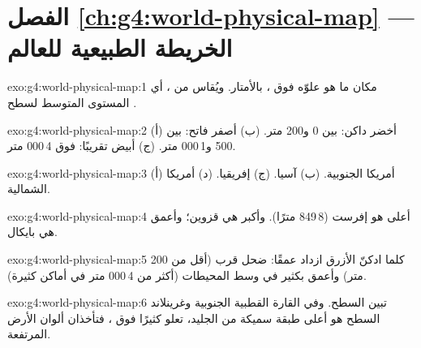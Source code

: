 \section*{الفصل \ref{ch:g4:world-physical-map} --- الخريطة الطبيعية للعالم}

\begin{solution}{exo:g4:world-physical-map:1}
 مكان ما هو علوّه فوق ، بالأمتار. ويُقاس من ، أي المستوى المتوسط لسطح .
\end{solution}

\begin{solution}{exo:g4:world-physical-map:2}
(أ) أخضر داكن: بين 0 و200 متر. (ب) أصفر فاتح: بين 500 و1\,000
متر. (ج) أبيض تقريبًا: فوق 4\,000 متر.
\end{solution}

\begin{solution}{exo:g4:world-physical-map:3}
(أ) أمريكا الجنوبية. (ب) آسيا. (ج) إفريقيا. (د) أمريكا الشمالية.
\end{solution}

\begin{solution}{exo:g4:world-physical-map:4}
أعلى  هو  إفرست (8\,849 مترًا). وأكبر  هي  قزوين؛ وأعمق
 هي  بايكال.
\end{solution}

\begin{solution}{exo:g4:world-physical-map:5}
كلما ادكنّ الأزرق ازداد  عمقًا:  ضحل قرب 
(أقل من 200 متر) وأعمق بكثير في وسط المحيطات (أكثر
من 4\,000 متر في أماكن كثيرة).
\end{solution}

\begin{solution}{exo:g4:world-physical-map:6}
 تبين  السطح. وفي القارة القطبية الجنوبية وغرينلاند
السطح هو أعلى طبقة سميكة من الجليد، تعلو كثيرًا فوق ،
فتأخذان ألوان الأرض المرتفعة.
\end{solution}

